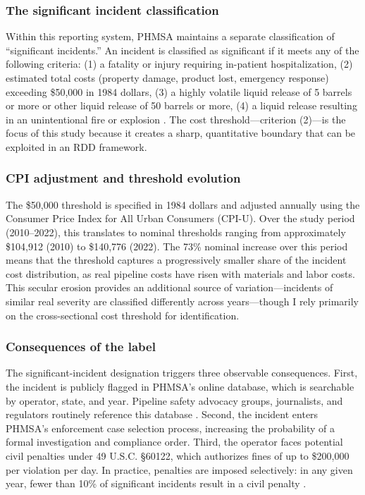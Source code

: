 \documentclass[12pt]{article}
\begin{document}
\subsubsection*{The significant incident classification} Within this reporting system, PHMSA maintains a separate classification of ``significant incidents.'' An incident is classified as significant if it meets any of the following criteria: (1) a fatality or injury requiring in-patient hospitalization, (2) estimated total costs (property damage, product lost, emergency response) exceeding \$50,000 in 1984 dollars, (3) a highly volatile liquid release of 5 barrels or more or other liquid release of 50 barrels or more, (4) a liquid release resulting in an unintentional fire or explosion \citep{phmsa_criteria}. The cost threshold---criterion (2)---is the focus of this study because it creates a sharp, quantitative boundary that can be exploited in an RDD framework.

\subsubsection*{CPI adjustment and threshold evolution} The \$50,000 threshold is specified in 1984 dollars and adjusted annually using the Consumer Price Index for All Urban Consumers (CPI-U). Over the study period (2010--2022), this translates to nominal thresholds ranging from approximately \$104,912 (2010) to \$140,776 (2022). The 73\% nominal increase over this period means that the threshold captures a progressively smaller share of the incident cost distribution, as real pipeline costs have risen with materials and labor costs. This secular erosion provides an additional source of variation---incidents of similar real severity are classified differently across years---though I rely primarily on the cross-sectional cost threshold for identification.

\subsubsection*{Consequences of the label} The significant-incident designation triggers three observable consequences. First, the incident is publicly flagged in PHMSA's online database, which is searchable by operator, state, and year. Pipeline safety advocacy groups, journalists, and regulators routinely reference this database \citep{psr2020report}. Second, the incident enters PHMSA's enforcement case selection process, increasing the probability of a formal investigation and compliance order. Third, the operator faces potential civil penalties under 49 U.S.C. \S 60122, which authorizes fines of up to \$200,000 per violation per day. In practice, penalties are imposed selectively: in any given year, fewer than 10\% of significant incidents result in a civil penalty \citep{phmsa_enforcement}.
\end{document}
